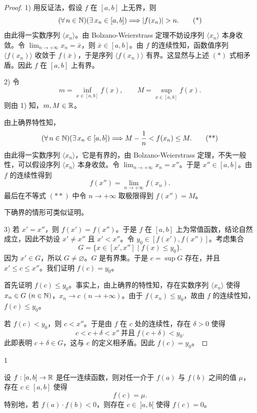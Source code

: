 \begin{proof}

	1) 用反证法，假设 \(f\) 在 \([a,b]\) 上无界，则
	\[
	(\forall\,n\in\N)(\exists\,x_n\in[a,b])\Longrightarrow|f(x_n)|>n. \tag{*}
	\]
	由此得一实数序列 \(\langle x_n\rangle\)。由 Bolzano-Weierstrass 定理不妨设序列 \(\langle x_n\rangle\) 本身收敛。令 \(\lim_{n\to+\infty}x_n=\bar x\)，则 \(\bar x\in[a,b]\)。由 \(f\) 的连续性知，函数值序列 \(\langle f(x_n)\rangle\) 收敛于 \(f(\bar x)\)，于是序列 \(\langle f(x_n)\rangle\) 有界。这显然与上述 \((*)\) 式相矛盾。因此 \(f\) 在 \([a,b]\) 上有界。

	2) 令
	\[
	m=\inf_{x\in[a,b]}f(x),\qquad M=\sup_{x\in[a,b]}f(x).
	\]
	则由 1) 知，\(m,M\in\mathbb{R}\)。

	由上确界特性知，
	\[
	(\forall\,n\in\mathbb{N})(\exists\,x_n\in[a,b])\Longrightarrow M-\frac1n<f(x_n)\le M. \tag{**}
	\]
	由此得一实数序列 \(\langle x_n\rangle\)，它是有界的，由 Bolzano-Weierstrass 定理，不失一般性，可以假设序列 \(\langle x_n\rangle\) 本身收敛。令 \(\lim_{n\to+\infty}x_n=x''\)。于是 \(x''\in[a,b]\)。由 \(f\) 的连续性得到
	\[
	f(x'')=\lim_{n\to+\infty}f(x_n).
	\]
	最后在不等式 \((**)\) 中令 \(n\to+\infty\) 取极限得到 \(f(x'')=M\)。

	下确界的情形可类似证明。

	3) 若 \(x'=x''\)，则 \(f(x')=f(x'')\)。于是 \(f\) 在 \([a,b]\) 上为常值函数，结论自然成立，因此不妨设 \(x'\neq x''\) 且 \(x'<x''\)。令 \(y_0\in[f(x'),f(x'')]\)。考虑集合
	\[
	G=\{x\in[x',x'']\mid f(x)\le y_0\}.
	\]
	因为 \(x'\in G\)，所以 \(G\neq\varnothing\)。\(G\) 是有界集。于是 \(c=\sup G\) 存在，并且 \(x'\le c\le x''\)。我们证明 \(f(c)=y_0\)。

	首先证明 \(f(c)\le y_0\)。事实上，由上确界的特性知，存在实数序列 \(\langle x_n\rangle\) 使得 \(x_n\in G\ (n\in\N)\)，\(x_n\to c\ (n\to+\infty)\)。由于 \(f(x_n)\le y_0\)，故由 \(f\) 的连续性知，\(f(c)\le y_0\)。

	若 \(f(c)<y_0\)，则 \(c<x''\)。于是由 \(f\) 在 \(c\) 处的连续性，存在 \(\delta>0\) 使得
	\[
	c<c+\delta<x''\ \text{并且}\ f(c+\delta)<y_0.
	\]
	此即表明 \(c+\delta\in G\)，这与 \(c\) 的定义相矛盾。因此 \(f(c)=y_0\)。

\end{proof}

\begin{mycor*}{1}

	设 \(f:[a,b]\to\mathbb{R}\) 是任一连续函数，则对任一介于 \(f(a)\) 与 \(f(b)\) 之间的值 \(\mu\)，存在 \(c\in[a,b]\) 使得
	\[
	f(c)=\mu.
	\]
	特别地，若 \(f(a)\cdot f(b)<0\)，则存在 \(c\in\ ]a,b[\) 使得 \(f(c)=0\)。

\end{mycor*}

